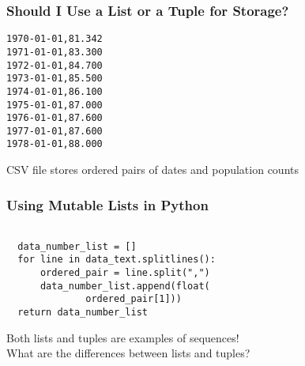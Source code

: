 \documentclass[14pt,aspectratio=169]{beamer}
\begin{document}
%
\begin{frame}[fragile]
  \frametitle{Should I Use a List or a Tuple for Storage?}
  \begin{minipage}{6in}
    \vspace*{.15in}
    \begin{verbatim}
1970-01-01,81.342
1971-01-01,83.300
1972-01-01,84.700
1973-01-01,85.500
1974-01-01,86.100
1975-01-01,87.000
1976-01-01,87.600
1977-01-01,87.600
1978-01-01,88.000
    \end{verbatim}
  \end{minipage}
  \vspace*{.05in}
  \begin{center}
    \normalsize \noindent CSV file stores ordered pairs of dates and
    population counts\\
  \end{center}
\end{frame}

%
\begin{frame}[fragile]
  \frametitle{Using Mutable Lists in Python}
  \begin{minipage}{6in}
    \vspace*{.15in}
    \begin{verbatim}

  data_number_list = []
  for line in data_text.splitlines():
      ordered_pair = line.split(",")
      data_number_list.append(float(
              ordered_pair[1]))
  return data_number_list

    \end{verbatim}
  \end{minipage}
  \vspace*{.025in}
  \begin{center}
    \normalsize \noindent Both lists and tuples are examples of sequences! \\
    \normalsize \noindent What are the differences between lists and tuples? \\
  \end{center}
\end{frame}
\end{document}
